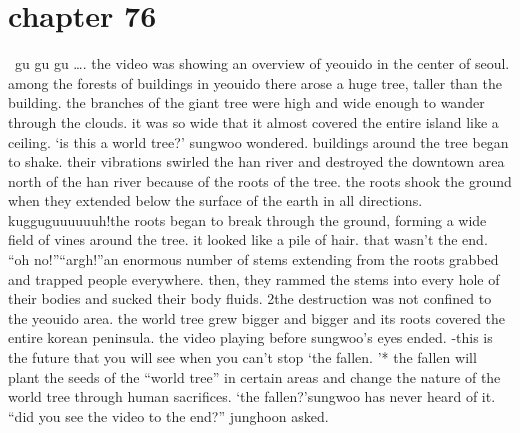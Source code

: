 \section{chapter 76}






 gu gu gu ….
the video was showing an overview of yeouido in the center of seoul.
among the forests of buildings in yeouido there arose a huge tree, taller than the building.
the branches of the giant tree were high and wide enough to wander through the clouds.
 it was so wide that it almost covered the entire island like a ceiling.
‘is this a world tree?’ sungwoo wondered.
buildings around the tree began to shake.
 their vibrations swirled the han river and destroyed the downtown area north of the han river because of the roots of the tree.
 the roots shook the ground when they extended below the surface of the earth in all directions.
kugguguuuuuuh!the roots began to break through the ground, forming a wide field of vines around the tree.
 it looked like a pile of hair.
that wasn’t the end.
“oh no!”“argh!”an enormous number of stems extending from the roots grabbed and trapped people everywhere.
 then, they rammed the stems into every hole of their bodies and sucked their body fluids.
2the destruction was not confined to the yeouido area.
 the world tree grew bigger and bigger and its roots covered the entire korean peninsula.
the video playing before sungwoo’s eyes ended.
-this is the future that you will see when you can’t stop ‘the fallen.
’* the fallen will plant the seeds of the “world tree” in certain areas and change the nature of the world tree through human sacrifices.
‘the fallen?’sungwoo has never heard of it.
“did you see the video to the end?” junghoon asked.

